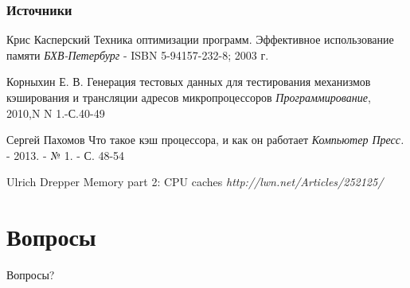 \documentclass{beamer}
\begin{document}
\begin{frame}
\frametitle{Источники}
\footnotesize{
\begin{thebibliography}{99} %
 Крис Касперский
\newblock Техника оптимизации программ. Эффективное использование памяти
\newblock \emph{БХВ-Петербург} - ISBN 5-94157-232-8; 2003 г.
\end{thebibliography}

\begin{thebibliography}{98}
 Корныхин Е. В.
\newblock Генерация тестовых данных для тестирования механизмов кэширования и трансляции адресов микропроцессоров
\newblock \emph{Программирование}, 2010,N N 1.-С.40-49
\end{thebibliography}

\begin{thebibliography}{97}
 Сергей Пахомов
\newblock Что такое кэш процессора, и как он работает
\newblock \emph{Компьютер Пресс.} - 2013. - № 1. - С. 48-54
\end{thebibliography}

\begin{thebibliography}{96}
 Ulrich Drepper
\newblock Memory part 2: CPU caches
\newblock \emph{http://lwn.net/Articles/252125/}
\end{thebibliography}
}
\end{frame}

\section{Вопросы}

\begin{frame}
\Huge{\centerline{Вопросы?}}
\end{frame}

\end{document}
